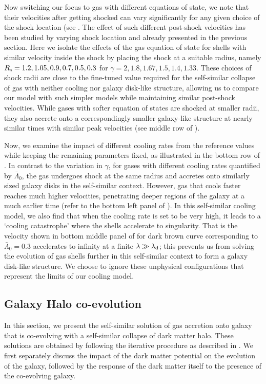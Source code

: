 Now switching our focus to gas with different equations of state, we note that their velocities after getting shocked can vary significantly for any given choice of the shock location (see . The effect of such different post-shock velocities has been studied by varying shock location and already presented in the previous section. Here we isolate the effects of the gas equation of state for shells with similar velocity inside the shock by placing the shock at a suitable radius, namely $R_{\rm s}=1.2,1.05,0.9,0.7,0.5, 0.3$ for $\gamma=2,1.8,1.67,1.5,1.4, 1.33$. These choices of shock radii are close to the fine-tuned value required for the self-similar collapse of gas with neither cooling nor galaxy disk-like structure, allowing us to compare our model with such simpler models while maintaining similar post-shock velocities.
While gases with softer equation of states are shocked at smaller radii, they also accrete onto a correspondingly smaller galaxy-like structure at nearly similar times with similar peak velocities (see middle row of ). %

Now, we examine the impact of different cooling rates from the reference values while keeping the remaining parameters fixed, as illustrated in the bottom row of . In contrast to the variation in $\gamma$, for gases with different cooling rates quantified by $\bar{\Lambda}_0$, the gas undergoes shock at the same radius and accretes onto similarly sized galaxy disks in the self-similar context. However, gas that cools faster reaches much higher velocities, penetrating deeper regions of the galaxy at a much earlier time (refer to the bottom left panel of ).
In this self-similar cooling model, we also find that when the cooling rate is set to be very high, it leads to a `cooling catastrophe' where the shells accelerate to singularity. That is the velocity shown in bottom middle panel of  for dark brown curve corresponding to $\bar{\Lambda}_0=0.3$ accelerates to infinity at a finite $\lambda \gg \lambda_{\rm d}$; %
this prevents us from solving the evolution of gas shells further in this self-similar context to form a galaxy disk-like structure. We choose to ignore these unphysical configurations that represent the limits of our cooling model. 








\subsection{Galaxy Halo co-evolution}
\label{sec:results-gas-dm-coevolve}
In this section, we 
present the self-similar solution of gas accretion onto galaxy that is co-evolving with a self-similar collapse of dark matter halo. These solutions are obtained by following the iterative procedure as described in . We first separately discuss the impact of the dark matter potential on the evolution of the galaxy, followed by the response of the dark matter itself to the presence of the co-evolving galaxy.



